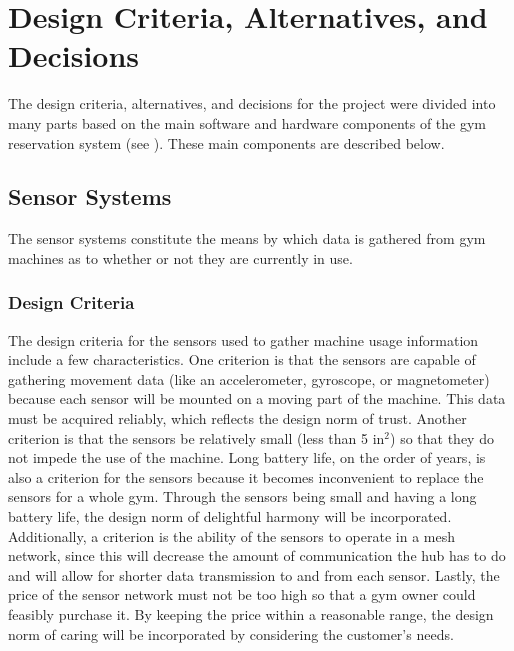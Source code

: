 \documentclass[PPFS.tex]{template/subfiles}
\begin{document}
\section{Design Criteria, Alternatives, and Decisions}

The design criteria, alternatives, and decisions for the project were divided into many parts based on the main software and hardware components of the gym reservation system (see ). These main components are described below.

\subsection{Sensor Systems}

The sensor systems constitute the means by which data is gathered from gym machines as to whether or not they are currently in use.

\subsubsection{Design Criteria}

The design criteria for the sensors used to gather machine usage information include a few characteristics. One criterion is that the sensors are capable of gathering movement data (like an accelerometer, gyroscope, or magnetometer) because each sensor will be mounted on a moving part of the machine. This data must be acquired reliably, which reflects the design norm of trust. Another criterion is that the sensors be relatively small (less than 5 in$^2$) so that they do not impede the use of the machine. Long battery life, on the order of years, is also a criterion for the sensors because it becomes inconvenient to replace the sensors for a whole gym. Through the sensors being small and having a long battery life, the design norm of delightful harmony will be incorporated. Additionally, a criterion is the ability of the sensors to operate in a mesh network, since this will decrease the amount of communication the hub has to do and will allow for shorter data transmission to and from each sensor. Lastly, the price of the sensor network must not be too high so that a gym owner could feasibly purchase it. By keeping the price within a reasonable range, the design norm of caring will be incorporated by considering the customer's needs.
\end{document}
